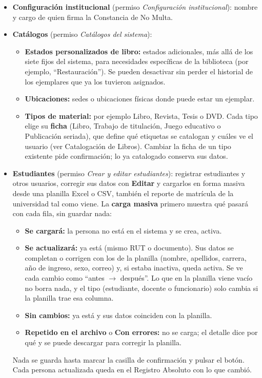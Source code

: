 \documentclass[11pt,a4paper]{report}
\begin{document}
\begin{itemize}
  \item \textbf{Configuración institucional} (permiso
  \textit{Configuración institucional}): nombre y cargo de quien firma la
  Constancia de No Multa.
  \item \textbf{Catálogos} (permiso \textit{Catálogos del sistema}):
  \begin{itemize}
    \item \textbf{Estados personalizados de libro:} estados adicionales,
    más allá de los siete fijos del sistema, para necesidades específicas
    de la biblioteca (por ejemplo, ``Restauración''). Se pueden desactivar
    sin perder el historial de los ejemplares que ya los tuvieron
    asignados.
    \item \textbf{Ubicaciones:} sedes o ubicaciones físicas donde puede
    estar un ejemplar.
    \item \textbf{Tipos de material:} por ejemplo Libro, Revista, Tesis o DVD.
    Cada tipo elige su \textbf{ficha} (Libro, Trabajo de titulación,
    Juego educativo o Publicación seriada), que define qué etiquetas se
    catalogan y cuáles ve el usuario (ver Catalogación de Libros).
    Cambiar la ficha de un tipo existente pide confirmación; lo ya
    catalogado conserva sus datos.
  \end{itemize}
  \item \textbf{Estudiantes} (permiso \textit{Crear y editar estudiantes}):
  registrar estudiantes y otros usuarios, corregir sus datos con
  \textbf{Editar} y cargarlos en forma masiva desde una planilla Excel o
  CSV, también el reporte de matrícula de la universidad tal como viene. La
  \textbf{carga masiva} primero muestra qué pasará con cada fila, sin
  guardar nada:
  \begin{itemize}
    \item \textbf{Se cargará:} la persona no está en el sistema y se crea,
    activa.
    \item \textbf{Se actualizará:} ya está (mismo RUT o documento). Sus
    datos se completan o corrigen con los de la planilla (nombre,
    apellidos, carrera, año de ingreso, sexo, correo) y, si estaba
    inactiva, queda activa. Se ve cada cambio como ``antes $\rightarrow$
    después''. Lo que en la planilla viene vacío no borra nada, y el tipo
    (estudiante, docente o funcionario) solo cambia si la planilla trae esa
    columna.
    \item \textbf{Sin cambios:} ya está y sus datos coinciden con la
    planilla.
    \item \textbf{Repetido en el archivo} o \textbf{Con errores:} no se
    carga; el detalle dice por qué y se puede descargar para corregir la
    planilla.
  \end{itemize}
  Nada se guarda hasta marcar la casilla de confirmación y pulsar el botón.
  Cada persona actualizada queda en el Registro Absoluto con lo que cambió.
\end{itemize}
\end{document}
